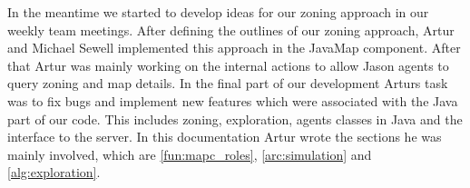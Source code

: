 In the meantime we started to develop ideas for our zoning approach in our weekly team meetings. After defining the outlines of our zoning approach, Artur and Michael Sewell implemented this approach in the JavaMap component. After that Artur was mainly working on the internal actions to allow Jason agents to query zoning and map details. In the final part of our development Arturs task was to fix bugs and implement new features which were associated with the Java part of our code. This includes zoning, exploration, agents classes in Java and the interface to the server.
In this documentation Artur wrote the sections he was mainly involved, which are \autoref{fun:mapc_roles}, \autoref{arc:simulation} and \autoref{alg:exploration}.